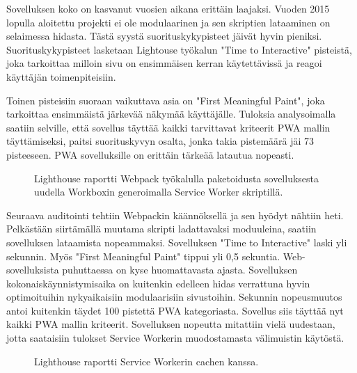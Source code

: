 \documentclass{tktltiki}
\begin{document}
\clearpage

Sovelluksen koko on kasvanut vuosien aikana erittäin laajaksi. Vuoden 2015 lopulla aloitettu projekti ei ole modulaarinen ja sen skriptien lataaminen on selaimessa hidasta. Tästä syystä suorituskykypisteet jäivät hyvin pieniksi. Suorituskykypisteet lasketaan Lightouse työkalun "Time to Interactive" pisteistä, joka tarkoittaa milloin sivu on ensimmäisen kerran käytettävissä ja reagoi käyttäjän toimenpiteisiin. 

Toinen pisteisiin suoraan vaikuttava asia on "First Meaningful Paint", joka tarkoittaa ensimmäistä järkevää näkymää käyttäjälle. Tuloksia analysoimalla saatiin selville, että sovellus täyttää kaikki tarvittavat kriteerit PWA mallin täyttämiseksi, paitsi suorituskyvyn osalta, jonka takia pistemäärä jäi 73 pisteeseen. PWA sovelluksille on erittäin tärkeää latautua nopeasti. 


\begin{figure}[!h]
\begin{center}
\caption{Lighthouse raportti Webpack työkalulla paketoidusta sovelluksesta uudella Workboxin generoimalla Service Worker skriptillä.}
\label{Lighthouse raportti 2}
\end{center}
\end{figure}

\clearpage

Seuraava auditointi tehtiin Webpackin käännöksellä ja sen hyödyt nähtiin heti. Pelkästään siirtämällä muutama skripti ladattavaksi moduuleina, saatiin sovelluksen lataamista nopeammaksi. Sovelluksen "Time to Interactive" laski yli sekunnin. Myös "First Meaningful Paint" tippui yli 0,5 sekuntia. Web-sovelluksista puhuttaessa on kyse huomattavasta ajasta. Sovelluksen kokonaiskäynnistymisaika on kuitenkin edelleen hidas verrattuna hyvin optimoituihin nykyaikaisiin modulaarisiin sivustoihin. Sekunnin nopeusmuutos antoi kuitenkin täydet 100 pistettä PWA kategoriasta. Sovellus siis täyttää nyt kaikki PWA mallin kriteerit. Sovelluksen nopeutta mitattiin vielä uudestaan, jotta saataisiin tulokset Service Workerin muodostamasta välimuistin käytöstä.

\begin{figure}[h]
\begin{center}
\caption{Lighthouse raportti Service Workerin cachen kanssa.}
\label{Lighthouse raportti 3}
\end{center}
\end{figure}
\end{document}
